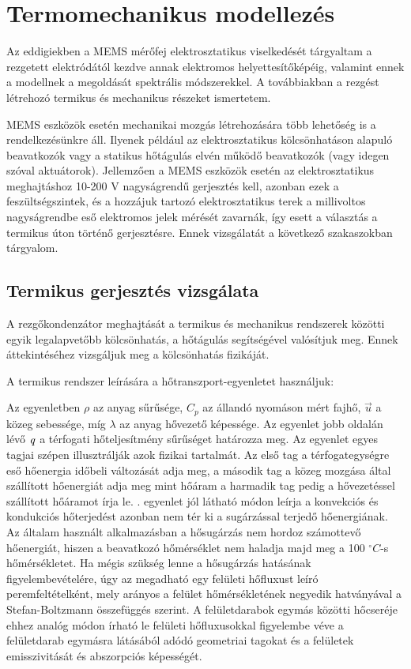 \section{Termomechanikus modellezés}

Az eddigiekben a MEMS mérőfej elektrosztatikus viselkedését tárgyaltam a rezgetett elektródától kezdve annak elektromos helyettesítőképéig, valamint ennek a modellnek a megoldását spektrális módszerekkel. A továbbiakban a rezgést létrehozó termikus és mechanikus részeket ismertetem.

MEMS eszközök esetén mechanikai mozgás létrehozására több lehetőség is a rendelkezésünkre áll. Ilyenek például az elektrosztatikus kölcsönhatáson alapuló beavatkozók\cite{bsc} vagy a statikus hőtágulás elvén működő beavatkozók\cite{thermal_MEMS} (vagy idegen szóval aktuátorok). Jellemzően a MEMS eszközök esetén az elektrosztatikus meghajtáshoz 10-200 V nagyságrendű gerjesztés kell\cite{el_stat_MEMS}, azonban ezek a feszültségszintek, és a hozzájuk tartozó elektrosztatikus terek a millivoltos nagyságrendbe eső elektromos jelek mérését zavarnák, így esett a választás a termikus úton történő gerjesztésre. Ennek vizsgálatát a következő szakaszokban tárgyalom.

\subsection{Termikus gerjesztés vizsgálata}

A rezgőkondenzátor meghajtását a termikus és mechanikus rendszerek közötti egyik legalapvetőbb kölcsönhatás, a hőtágulás segítségével  valósítjuk meg. Ennek áttekintéséhez vizsgáljuk meg a kölcsönhatás fizikáját.

A termikus rendszer leírására a hőtranszport-egyenletet használjuk:


Az egyenletben $\rho$ az anyag sűrűsége, $C_p$ az állandó nyomáson mért fajhő, $\vec{u}$ a közeg sebessége, míg $\lambda$ az anyag hővezető képessége. Az egyenlet jobb oldalán lévő $\it{q}$ a térfogati hőteljesítmény sűrűséget határozza meg. Az egyenlet egyes tagjai szépen illusztrálják azok fizikai tartalmát. Az első tag a térfogategységre eső hőenergia időbeli változását adja meg, a második tag a közeg mozgása által szállított hőenergiát adja meg mint hőáram a harmadik tag pedig a hővezetéssel szállított hőáramot írja le. . egyenlet jól látható módon leírja a konvekciós és kondukciós hőterjedést azonban nem tér ki a sugárzással terjedő hőenergiának. Az általam használt alkalmazásban a hősugárzás nem hordoz számottevő hőenergiát, hiszen a beavatkozó hőmérséklet nem haladja majd meg a 100 $^\circ C$-s hőmérsékletet. Ha mégis szükség lenne a hősugárzás hatásának figyelembevételére, úgy az megadható egy felületi hőfluxust leíró peremfeltételként, mely arányos a felület hőmérsékletének negyedik hatványával a Stefan-Boltzmann összefüggés szerint. A felületdarabok egymás közötti hőcseréje ehhez analóg módon írható le felületi hőfluxusokkal figyelembe véve a felületdarab egymásra látásából adódó geometriai tagokat és a felületek emisszivitását és abszorpciós képességét.

